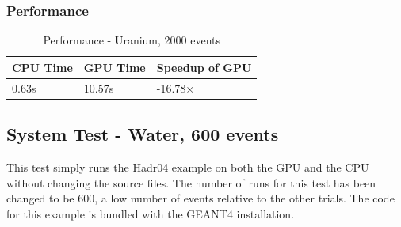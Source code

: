 \documentclass[12pt]{article}
\begin{document}
		\subsubsection{Performance}
		\begin{table}[!htbp]
		\centering
		\caption{Performance - Uranium, 2000 events}\label{sys2Perf}
		\begin{tabular}{lll}
		\toprule
		CPU Time& GPU Time&Speedup of GPU\\\midrule
		0.63s&10.57s&-16.78$\times$\\\bottomrule
		\end{tabular}
		\end{table}

\subsection{System Test - Water, 600 events}
This test simply runs the Hadr04 example on both the GPU and the CPU without changing the source files. The number of runs for this test has been changed to be 600, a low number of events relative to the other trials. The code for this example is bundled with the GEANT4 installation.
\end{document}
